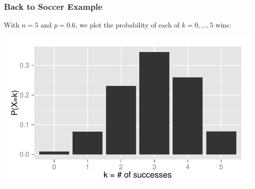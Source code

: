 \documentclass[handout]{beamer}
\begin{document}
%
%
%


\begin{frame}
\frametitle{Back to Soccer Example}

With $n=5$ and $p=0.6$, we plot the probability of each of $k=0, \ldots, 5$ wins:

\pause\begin{center}
\includegraphics[width=\textwidth]{figure/bin.pdf}
\end{center}

\end{frame}
\end{document}
